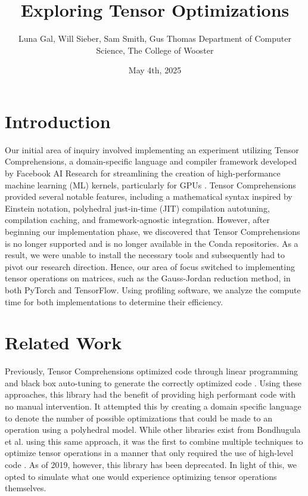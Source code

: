 \documentclass[12pt]{article}
\title{Exploring Tensor Optimizations}
\date{May 4th, 2025}
\author{\parbox{\linewidth}{\centering%
    Luna Gal, Will Sieber, Sam Smith, Gus Thomas
	\endgraf\bigskip
	Department of Computer Science, The College of Wooster
	\bigskip
}}
\begin{document}
\maketitle

\newpage
\tableofcontents
\newpage

\lstlistoflistings
\newpage

\section{Introduction}
Our initial area of inquiry involved implementing an experiment utilizing Tensor Comprehensions, a domain-specific language and compiler framework developed by Facebook AI Research for streamlining the creation of high-performance machine learning (ML) kernels, particularly for GPUs \cite{tens}. Tensor Comprehensions provided several notable features, including a mathematical syntax inspired by Einstein notation, polyhedral just-in-time (JIT) compilation autotuning, compilation caching, and framework-agnostic integration. However, after beginning our implementation phase, we discovered that Tensor Comprehensions is no longer supported and is no longer available in the Conda repositories. As a result, we were unable to install the necessary tools and subsequently had to pivot our research direction. Hence, our area of focus switched to implementing tensor operations on matrices, such as the Gauss-Jordan reduction method, in both PyTorch and TensorFlow. Using profiling software, we analyze the compute time for both implementations to determine their efficiency.

\section{Related Work}
Previously, Tensor Comprehensions optimized code through linear programming and black box auto-tuning to generate the correctly optimized code \cite{neu}. Using these approaches, this library had the benefit of providing high performant code with no manual intervention. It attempted this by creating a domain specific language to denote the number of possible optimizations that could be made to an operation using a polyhedral model. While other libraries exist from Bondhugula et al. using this same approach, it was the first to combine multiple techniques to optimize tensor operations in a manner that only required the use of high-level code \cite{neu, bondhugula2008practical}. As of 2019, however, this library has been deprecated. In light of this, we opted to simulate what one would experience optimizing tensor operations themselves.
\end{document}
